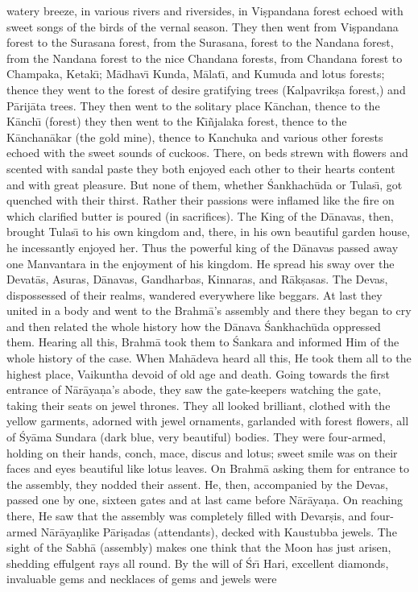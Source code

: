 watery breeze, in various rivers and riversides, in Vi\d{s}pandana forest echoed with sweet songs of the birds of the vernal season. They then went from Vi\d{s}pandana forest to the Surasana forest, from the Surasana, forest to the Nandana forest, from the Nandana forest to the nice Chandana forests, from Chandana forest to Champaka, Ketak\={\i}; M\=adhav\={\i} Kunda, M\=alat\={\i}, and Kumuda and lotus forests; thence they went to the forest of desire gratifying trees (Kalpavrik\d{s}a forest,) and P\=arij\=ata trees. They then went to the solitary place K\=anchan, thence to the K\=anch\={\i} (forest) they then went to the K\={\i}\~njalaka forest, thence to the K\=anchan\=akar (the gold mine), thence to Kanchuka and various other forests echoed with the sweet sounds of cuckoos. There, on beds strewn with flowers and scented with sandal paste they both enjoyed each other to their hearts content and with great pleasure. But none of them, whether \'Sankhach\=uda or Tulas\={\i}, got quenched with their thirst. Rather their passions were inflamed like the fire on which clarified butter is poured (in sacrifices). The King of the D\=anavas, then, brought Tulas\={\i} to his own kingdom and, there, in his own beautiful garden house, he incessantly enjoyed her. Thus the powerful king of the D\=anavas passed away one Manvantara in the enjoyment of his kingdom. He spread his sway over the Devat\=as, Asuras, D\=anavas, Gandharbas, Kinnaras, and R\=ak\d{s}asas. The Devas, dispossessed of their realms, wandered everywhere like beggars. At last they united in a body and went to the Brahm\=a's assembly and there they began to cry and then related the whole history how the D\=anava \'Sankhach\=uda oppressed them. Hearing all this, Brahm\=a took them to \'Sankara and informed Him of the whole history of the case. When Mah\=adeva heard all this, He took them all to the highest place, Vaikuntha devoid of old age and death. Going towards the first entrance of N\=ar\=aya\d{n}a's abode, they saw the gate-keepers watching the gate, taking their seats on jewel thrones. They all looked brilliant, clothed with the yellow garments, adorned with jewel ornaments, garlanded with forest flowers, all of \'Sy\=ama Sundara (dark blue, very beautiful) bodies. They were four-armed, holding on their hands, conch, mace, discus and lotus; sweet smile was on their faces and eyes beautiful like lotus leaves. On Brahm\=a asking them for entrance to the assembly, they nodded their assent. He, then, accompanied by the Devas, passed one by one, sixteen gates and at last came before N\=ar\=aya\d{n}a. On reaching there, He saw that the assembly was completely filled with Devar\d{s}is, and four-armed N\=ar\=aya\d{n}like P\=ari\d{s}adas (attendants), decked with Kaustubba jewels. The sight of the Sabh\=a (assembly) makes one think that the Moon has just arisen, shedding effulgent rays all round. By the will of \'Sr\={\i} Hari, excellent diamonds, invaluable gems and necklaces of gems and jewels were

